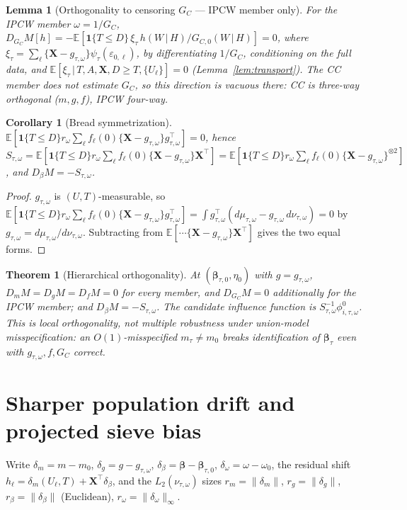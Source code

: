 \documentclass[11pt]{article}
\newtheorem{theorem}{Theorem}
\newtheorem{lemma}{Lemma}
\newtheorem{corollary}{Corollary}
\theoremstyle{remark}\newtheorem{remark}{Remark}
\newcommand{\E}{\mathbb{E}}
\newcommand{\X}{\bm{X}}
\newcommand{\bbeta}{\bm{\beta}}
\newcommand{\indc}[1]{\mathbf{1}\{#1\}}
\newcommand{\given}{\,\vert\,}
\newcommand{\rom}{r_{\omega}}
\begin{document}
\begin{lemma}[Orthogonality to censoring $G_C$ --- IPCW member only]\label{lem:G}
For the IPCW member $\omega=1/G_C$,
$D_{G_C}M[h]=-\E[\indc{T\le D}\,\xi_\tau\,h(W\given H)/G_{C,0}(W\given H)]=0$,
where $\xi_\tau=\sum_\ell\{\X-g_{\tau,\omega}\}\psi_\tau(\varepsilon_{0,\ell})$,
by differentiating $1/G_C$, conditioning on the full data, and
$\E[\xi_\tau\given T,A,\X,D\ge T,\{U_\ell\}]=0$ (Lemma~\ref{lem:transport}). The
CC member does \emph{not} estimate $G_C$, so this direction is vacuous there:
CC is \emph{three-way} orthogonal ($m,g,f$), IPCW \emph{four-way}.
\end{lemma}

\begin{corollary}[Bread symmetrization]\label{cor:S}
$\E[\indc{T\le D}\rom\sum_\ell f_\ell(0)\{\X-g_{\tau,\omega}\}g_{\tau,\omega}^\top]
=0$, hence
$S_{\tau,\omega}=\E[\indc{T\le D}\rom\sum_\ell f_\ell(0)\{\X-g_{\tau,\omega}\}
\X^\top]=\E[\indc{T\le D}\rom\sum_\ell f_\ell(0)\{\X-g_{\tau,\omega}\}^{\otimes2}]$,
and $D_\beta M=-S_{\tau,\omega}$.
\end{corollary}
\begin{proof}
$g_{\tau,\omega}$ is $(U,T)$-measurable, so
$\E[\indc{T\le D}\rom\sum_\ell f_\ell(0)\{\X-g_{\tau,\omega}\}g_{\tau,\omega}^\top]
=\int g_{\tau,\omega}^\top(d\mu_{\tau,\omega}-g_{\tau,\omega}\,d\nu_{\tau,\omega})
=0$ by $g_{\tau,\omega}=d\mu_{\tau,\omega}/d\nu_{\tau,\omega}$. Subtracting from
$\E[\cdots\{\X-g_{\tau,\omega}\}\X^\top]$ gives the two equal forms.
\end{proof}

\begin{theorem}[Hierarchical orthogonality]\label{thm:orth}
At $(\bbeta_{\tau,0},\eta_0)$ with $g=g_{\tau,\omega}$, $D_mM=D_gM=D_fM=0$ for
every member, and $D_{G_C}M=0$ additionally for the IPCW member; and
$D_\beta M=-S_{\tau,\omega}$. The candidate influence function is
$S_{\tau,\omega}^{-1}\phi^0_{i,\tau,\omega}$. This is \emph{local} orthogonality,
not multiple robustness under union-model misspecification: an $O(1)$-misspecified
$m_\tau\neq m_0$ breaks identification of $\bbeta_\tau$ even with
$g_{\tau,\omega},f,G_C$ correct.
\end{theorem}

\section{Sharper population drift and projected sieve bias}\label{sec:drift}
Write $\delta_m=m-m_0$, $\delta_g=g-g_{\tau,\omega}$,
$\delta_\beta=\bbeta-\bbeta_{\tau,0}$, $\delta_\omega=\omega-\omega_0$, the
residual shift $h_\ell=\delta_m(U_\ell,T)+\X^\top\delta_\beta$, and the
$L_2(\nu_{\tau,\omega})$ sizes $r_m=\|\delta_m\|$, $r_g=\|\delta_g\|$,
$r_\beta=\|\delta_\beta\|$ (Euclidean), $r_\omega=\|\delta_\omega\|_\infty$.
\end{document}
